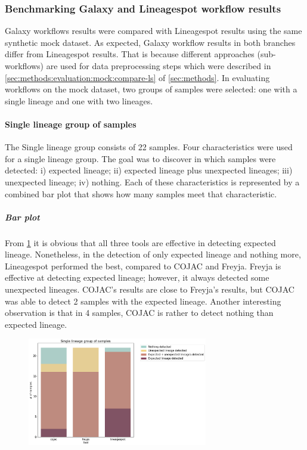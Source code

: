         \subsubsection{Benchmarking Galaxy and Lineagespot workflow results}
        Galaxy workflows results were compared with Lineagespot results using the same synthetic mock dataset. As expected, Galaxy workflow results in both branches differ from Lineagespot results. That is because different approaches (sub-workflows) are used for data preprocessing steps which were described in \autoref{sec:methods:evaluation:mock:compare-ls} of \cref{sec:methods}. In evaluating workflows on the mock dataset, two groups of samples were selected: one with a single lineage and one with two lineages.
            \paragraph{Single lineage group of samples}
            The Single lineage group consists of 22 samples. Four characteristics were used for a single lineage group. The goal was to discover in which samples were detected: i) expected lineage; ii) expected lineage plus unexpected lineages; iii) unexpected lineage; iv) nothing. Each of these characteristics is represented by a combined bar plot that shows how many samples meet that characteristic.
                \subparagraph{Bar plot}
                From \cref{fig:results:mock:bar-singlin} it is obvious that all three tools are effective in detecting expected lineage. Nonetheless, in the detection of only expected lineage and nothing more, Lineagespot performed the best, compared to COJAC and Freyja. Freyja is effective at detecting expected lineage; however, it always detected some unexpected lineages. COJAC's results are close to Freyja's results, but COJAC was able to detect 2 samples with the expected lineage. Another interesting observation is that in 4 samples, COJAC is rather to detect nothing than expected lineage. 
                \begin{figure}[ht!]
                	\centering
                    \includegraphics[width=0.7\textwidth]{figures/results/mock/singlin-num-bars.png}
                    \label{fig:results:mock:bar-singlin}
                \end{figure}

